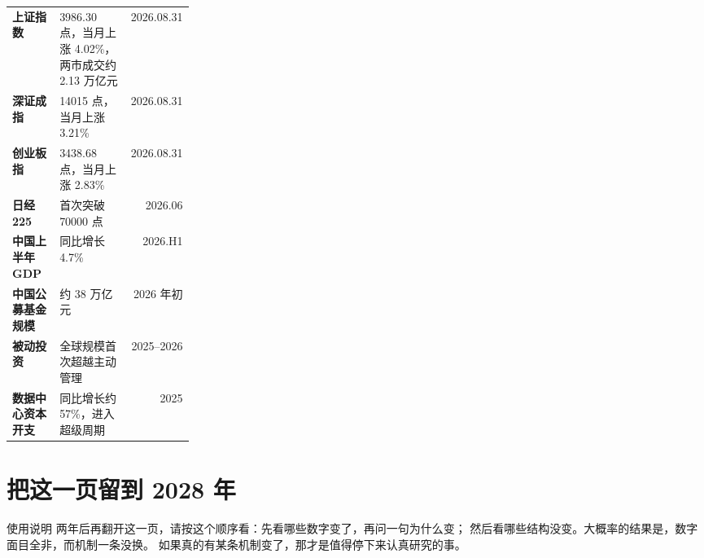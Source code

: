 \begin{tablewrap}
\begin{xltabular}{\linewidth}{>{\raggedright\arraybackslash}p{0.26\linewidth}Xr}
\toprule
{} &  &  \\
\midrule
\textbf{上证指数} & 3986.30 点，当月上涨 4.02\%，两市成交约 2.13 万亿元 & 2026.08.31 \\
\textbf{深证成指} & 14015 点，当月上涨 3.21\% & 2026.08.31 \\
\textbf{创业板指} & 3438.68 点，当月上涨 2.83\% & 2026.08.31 \\
\textbf{日经 225} & 首次突破 70000 点 & 2026.06 \\
\textbf{中国上半年 GDP} & 同比增长 4.7\% & 2026.H1 \\
\textbf{中国公募基金规模} & 约 38 万亿元 & 2026 年初 \\
\textbf{被动投资} & 全球规模首次超越主动管理 & 2025--2026 \\
\textbf{数据中心资本开支} & 同比增长约 57\%，进入超级周期 & 2025 \\
\bottomrule
\end{xltabular}
\end{tablewrap}

\section{把这一页留到 2028 年}

\begin{takeaway}{使用说明}
两年后再翻开这一页，请按这个顺序看：先看哪些数字变了，再问一句为什么变；
然后看哪些结构没变。大概率的结果是，数字面目全非，而机制一条没换。
如果真的有某条机制变了，那才是值得停下来认真研究的事。
\end{takeaway}

\cleardoublepage